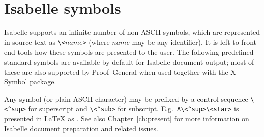

\chapter{Isabelle symbols}\label{app:symbols}

Isabelle supports an infinite number of non-ASCII symbols, which are
represented in source text as \verb,\<,$name$\verb,>, (where $name$ may be any
identifier).  It is left to front-end tools how these symbols are presented to
the user.  The following predefined standard symbols are available by default
for Isabelle document output; most of these are also supported by
Proof~General when used together with the X-Symbol package.

\begin{center}
    
\end{center}

Any symbol (or plain ASCII character) may be prefixed by a control sequence
\verb,\<^sup>, for superscript and \verb,\<^sub>, for subscript.  E.g.\ 
\verb,A\<^sup>\<star>, is presented in {\LaTeX} as
.  See also Chapter~\ref{ch:present} for more
information on Isabelle document preparation and related issues.

